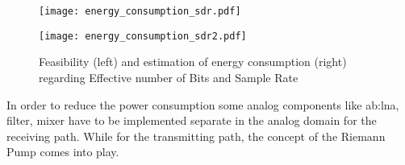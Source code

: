 \begin{figure}[htbp]
	\begin{minipage}{0.49\linewidth} 
	\texttt{[image: energy\_consumption\_sdr.pdf]}
	\end{minipage}
	\hfill
	\begin{minipage}{0.49\linewidth}
	\texttt{[image: energy\_consumption\_sdr2.pdf]}
	\end{minipage}
 \caption{Feasibility (left) and estimation of energy consumption (right) regarding Effective number of Bits and Sample Rate \cite{RivetDevalJ.-B.EtAl2010}}
 \label{fig:feas_energy}
\end{figure}

In order to reduce the power consumption some analog components like \gls{ab:lna}, filter, mixer have to be implemented separate in the analog domain for the receiving path.
While for the transmitting path, the concept of the Riemann Pump comes into play.

